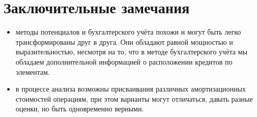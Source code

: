 \documentclass[a4paper,11pt]{article}
\begin{document}
\section{Заключительные замечания}

\begin{itemize}
\item методы потенциалов и бухгалтерского учёта похожи и могут быть легко
  трансформированы друг в друга. Они обладают равной мощностью и
  выразительностью, несмотря на то, что в методе бухгалтерского учёта мы
  обладаем дополнительной информацией о расположении кредитов по элементам.
\item в процессе анализа возможны присваивания различных амортизационных
  стоимостей операциям, при этом варианты могут отличаться, давать разные
  оценки, но быть одновременно верными.
\end{itemize}
\end{document}
